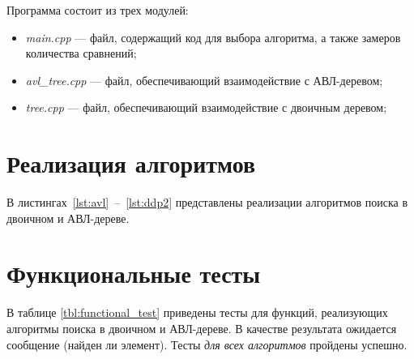 Программа состоит из трех модулей:
\begin{itemize}[label={---}]
	\item \textit{main.cpp} --- файл, содержащий код для выбора алгоритма, а также замеров количества сравнений;
	\item \textit{avl\_tree.cpp} --- файл, обеспечивающий взаимодействие с АВЛ-деревом;
	\item \textit{tree.cpp} --- файл, обеспечивающий взаимодействие с двоичным деревом;
\end{itemize}

\section{Реализация алгоритмов}

В листингах~\ref{lst:avl}~--~\ref{lst:ddp2} представлены реализации алгоритмов поиска в двоичном и АВЛ-дереве.







\section{Функциональные тесты}

В таблице \ref{tbl:functional_test} приведены тесты для функций, реализующих алгоритмы поиска в двоичном и АВЛ-дереве. В качестве результата ожидается сообщение (найден ли элемент). Тесты \textit{для всех алгоритмов} пройдены успешно. 

